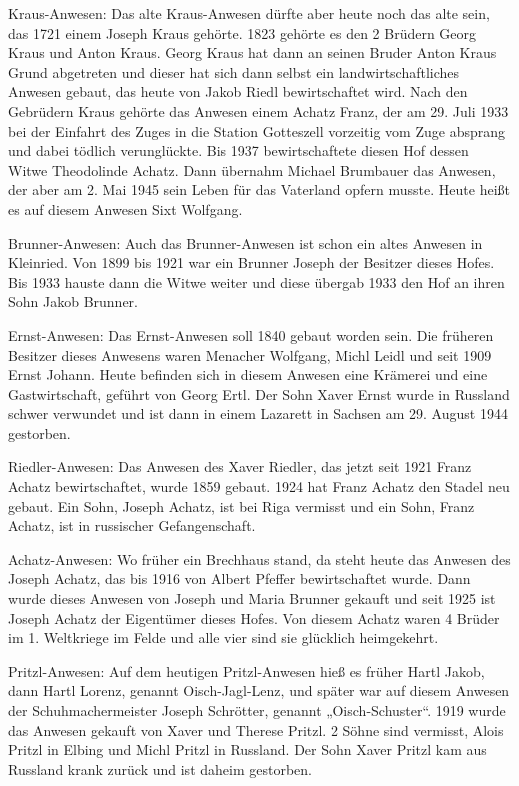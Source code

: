 \documentclass[12pt,a4pager]{book}
\begin{document}
Kraus-Anwesen: Das alte Kraus-Anwesen dürfte aber heute noch das alte sein, das
1721 einem Joseph Kraus gehörte. 1823 gehörte es den 2 Brüdern Georg Kraus und
Anton Kraus. Georg Kraus hat dann an seinen Bruder Anton Kraus Grund abgetreten
und dieser hat sich dann selbst ein landwirtschaftliches Anwesen gebaut, das
heute von Jakob Riedl bewirtschaftet wird. Nach den Gebrüdern Kraus gehörte das
Anwesen einem Achatz Franz, der am 29. Juli 1933 bei der Einfahrt des Zuges in
die Station Gotteszell vorzeitig vom Zuge absprang und dabei tödlich
verunglückte. Bis 1937 bewirtschaftete diesen Hof dessen Witwe Theodolinde
Achatz. Dann übernahm Michael Brumbauer das Anwesen, der aber am 2. Mai 1945
sein Leben für das Vaterland opfern musste. Heute heißt es auf diesem Anwesen
Sixt Wolfgang.

Brunner-Anwesen: Auch das Brunner-Anwesen ist schon ein altes Anwesen in
Kleinried. Von 1899 bis 1921 war ein Brunner Joseph der Besitzer dieses Hofes.
Bis 1933 hauste dann die Witwe weiter und diese übergab 1933 den Hof an ihren
Sohn Jakob Brunner.

Ernst-Anwesen: Das Ernst-Anwesen soll 1840 gebaut worden sein. Die früheren
Besitzer dieses Anwesens waren Menacher Wolfgang, Michl Leidl und seit 1909
Ernst Johann. Heute befinden sich in diesem Anwesen eine Krämerei und eine
Gastwirtschaft, geführt von Georg Ertl. Der Sohn Xaver Ernst wurde in Russland
schwer verwundet und ist dann in einem Lazarett in Sachsen am 29. August 1944
gestorben.

Riedler-Anwesen: Das Anwesen des Xaver Riedler, das jetzt seit 1921 Franz Achatz
bewirtschaftet, wurde 1859 gebaut. 1924 hat Franz Achatz den Stadel neu gebaut.
Ein Sohn, Joseph Achatz, ist bei Riga vermisst und ein Sohn, Franz Achatz, ist
in russischer Gefangenschaft.

Achatz-Anwesen: Wo früher ein Brechhaus stand, da steht heute das Anwesen des
Joseph Achatz, das bis 1916 von Albert Pfeffer bewirtschaftet wurde. Dann wurde
dieses Anwesen von Joseph und Maria Brunner gekauft und seit 1925 ist Joseph
Achatz der Eigentümer dieses Hofes. Von diesem Achatz waren 4 Brüder im 1.
Weltkriege im Felde und alle vier sind sie glücklich heimgekehrt.

Pritzl-Anwesen: Auf dem heutigen Pritzl-Anwesen hieß es früher Hartl Jakob, dann
Hartl Lorenz, genannt Oisch-Jagl-Lenz, und später war auf diesem Anwesen der
Schuhmachermeister Joseph Schrötter, genannt „Oisch-Schuster“. 1919 wurde das
Anwesen gekauft von Xaver und Therese Pritzl. 2 Söhne sind vermisst, Alois
Pritzl in Elbing und Michl Pritzl in Russland. Der Sohn Xaver Pritzl kam aus
Russland krank zurück und ist daheim gestorben.
\end{document}
